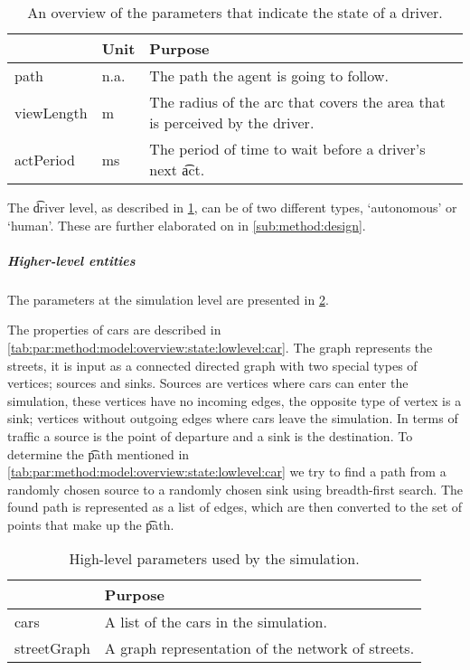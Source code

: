 	\begin{table}
		\centering
		\begin{tabularx}{\textwidth}{>{\ttfamily}llX}
			\toprule
			\normalfont{Parameter}	&Unit & Purpose \\ 
			\midrule
			path					
				& n.a. 
				& The path the agent is going to follow. \\ 
			viewLength 			
				& \si{\meter}
				& The radius of the arc that covers the area that is perceived by the driver.\\ 
			actPeriod
				& \si{\milli\second}
				& The period of time to wait before a driver's next \t{act}. \\
			\bottomrule
		\end{tabularx}
		\caption{An overview of the parameters that indicate the state of a driver.}
		\label{tab:par:method:model:overview:state:lowlevel:driver}
	\end{table}

	The \t{driver} level, as described in \cref{tab:par:method:model:overview:state:lowlevel:driver}, can be of two different types, `autonomous' or `human'. These are further elaborated on in \cref{sub:method:design}.

	\subparagraph{Higher-level entities}
	The parameters at the simulation level are presented in \cref{tab:par:method:model:overview:state:highlevel:sim}.

	The properties of cars are described in \cref{tab:par:method:model:overview:state:lowlevel:car}. The graph represents the streets, it is input as a connected directed graph with two special types of vertices; sources and sinks. Sources are vertices where cars can enter the simulation, these vertices have no incoming edges, the opposite type of vertex is a sink; vertices without outgoing edges where cars leave the simulation. In terms of traffic a source is the point of departure and a sink is the destination. To determine the \t{path} mentioned in \cref{tab:par:method:model:overview:state:lowlevel:car} we try to find a path from a randomly chosen source to a randomly chosen sink using breadth-first search. The found path is represented as a list of edges, which are then converted to the set of points that make up the \t{path}.
	
	\begin{table}[H]
		\centering
		\begin{tabularx}{\textwidth}{>{\ttfamily}lX}
			\toprule
			\normalfont{Parameter}	& Purpose \\  
			\midrule
			cars 					& A list of the cars in the simulation. \\ 
			streetGraph		 		& A graph representation of the network of streets. \\ 
			\bottomrule
		\end{tabularx}
		\caption{High-level parameters used by the simulation.}
		\label{tab:par:method:model:overview:state:highlevel:sim}
	\end{table}


